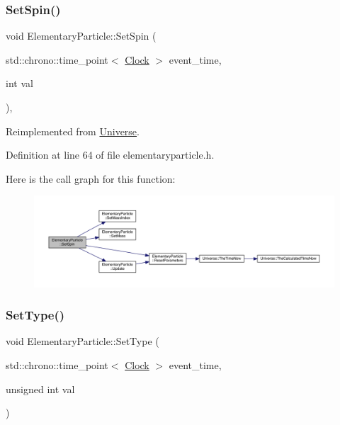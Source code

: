 \subsubsection{\texorpdfstring{Set\+Spin()}{SetSpin()}}
{\footnotesize\ttfamily void Elementary\+Particle\+::\+Set\+Spin (\begin{DoxyParamCaption}\item[{std\+::chrono\+::time\+\_\+point$<$ \hyperlink{universe_8h_a0ef8d951d1ca5ab3cfaf7ab4c7a6fd80}{Clock} $>$}]{event\+\_\+time,  }\item[{int}]{val }\end{DoxyParamCaption})\hspace{0.3cm}{\ttfamily [inline]}, {\ttfamily [virtual]}}



Reimplemented from \hyperlink{class_universe_ae2ae1c3b3e4cde2c18f5f6a814761ec8}{Universe}.



Definition at line 64 of file elementaryparticle.\+h.

Here is the call graph for this function\+:
\nopagebreak
\begin{figure}[H]
\begin{center}
\leavevmode
\includegraphics[width=350pt]{class_elementary_particle_a437fa86d88157314b84662b158d52353_cgraph}
\end{center}
\end{figure}
\mbox{\label{class_elementary_particle_a37d7718faf6be68d4374bcc56816f30a}} 
\subsubsection{\texorpdfstring{Set\+Type()}{SetType()}}
{\footnotesize\ttfamily void Elementary\+Particle\+::\+Set\+Type (\begin{DoxyParamCaption}\item[{std\+::chrono\+::time\+\_\+point$<$ \hyperlink{universe_8h_a0ef8d951d1ca5ab3cfaf7ab4c7a6fd80}{Clock} $>$}]{event\+\_\+time,  }\item[{unsigned int}]{val }\end{DoxyParamCaption})\hspace{0.3cm}{\ttfamily [inline]}}



